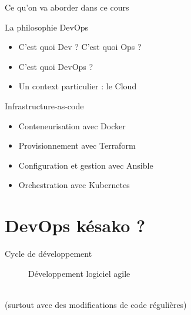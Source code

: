 \documentclass[aspectratio=169,10pt]{beamer}
\begin{document}

\begin{frame}{Ce qu'on va aborder dans ce cours}

\begin{alertblock}{La philosophie DevOps}
    \begin{itemize}
        \item C'est quoi Dev ? C'est quoi Ops ?
        \item C'est quoi DevOps ?
        \item Un context particulier : le Cloud
    \end{itemize}
\end{alertblock}

\begin{alertblock}{Infrastructure-as-code}
    \begin{itemize}
        \item Conteneurisation avec Docker
        \item Provisionnement avec Terraform
        \item Configuration et gestion avec Ansible
        \item Orchestration avec Kubernetes
    \end{itemize}
\end{alertblock}
 
\end{frame}


\section{DevOps késako ?}


\begin{frame}{Cycle de développement}

\begin{figure}
    \centering
    
    \caption{Développement logiciel agile}
\end{figure}
 
\end{frame}


\begin{frame}

\\
{\large(surtout avec des modifications de code régulières)}

\end{frame}
\end{document}
